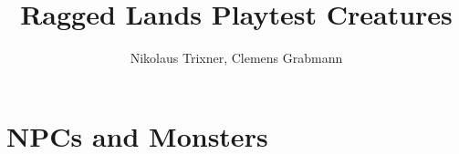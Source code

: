 \documentclass[a4paper]{book}
\begin{document}
	\title{Ragged Lands Playtest Creatures}
	\author{Nikolaus Trixner, Clemens Grabmann}
		
	\maketitle
	
	\tableofcontents


\part{NPCs and Monsters}\label{part:monsters}
	
	
	
	
	
	
	
	
	
	
	
	
	
\newpage
\end{document}
